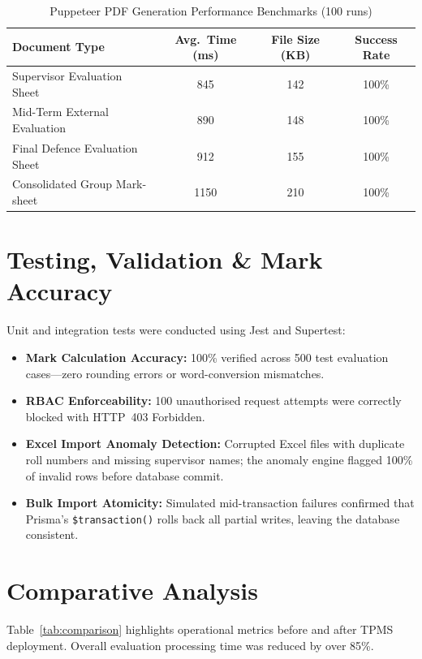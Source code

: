 \documentclass[12pt]{report}
\begin{document}
\begin{table}[H]
\centering
\caption{Puppeteer PDF Generation Performance Benchmarks (100 runs)}
\label{tab:pdf_perf}
\begin{tabular}{l c c c}
\toprule
\textbf{Document Type} & \textbf{Avg.\ Time (ms)} & \textbf{File Size (KB)} & \textbf{Success Rate}\\
\midrule
Supervisor Evaluation Sheet       & 845  & 142 & 100\%\\
Mid-Term External Evaluation      & 890  & 148 & 100\%\\
Final Defence Evaluation Sheet    & 912  & 155 & 100\%\\
Consolidated Group Mark-sheet     & 1150 & 210 & 100\%\\
\bottomrule
\end{tabular}
\end{table}

\section{Testing, Validation \& Mark Accuracy}
Unit and integration tests were conducted using Jest and Supertest:
\begin{itemize}[leftmargin=1.5cm]
    \item \textbf{Mark Calculation Accuracy:} 100\% verified across 500 test evaluation
          cases---zero rounding errors or word-conversion mismatches.
    \item \textbf{RBAC Enforceability:} 100 unauthorised request attempts were correctly
          blocked with HTTP~403 Forbidden.
    \item \textbf{Excel Import Anomaly Detection:} Corrupted Excel files with duplicate
          roll numbers and missing supervisor names; the anomaly engine flagged 100\%
          of invalid rows before database commit.
    \item \textbf{Bulk Import Atomicity:} Simulated mid-transaction failures confirmed
          that Prisma's \texttt{\$transaction()} rolls back all partial writes, leaving
          the database consistent.
\end{itemize}

\section{Comparative Analysis}
Table~\ref{tab:comparison} highlights operational metrics before and after TPMS
deployment. Overall evaluation processing time was reduced by over 85\%.
\end{document}
